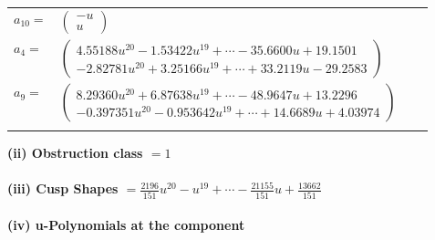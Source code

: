 \documentclass[1p]{elsarticle_modified}
\theoremstyle{definition}
\begin{document}
\begin{tabular}{m{7pt} m{180pt} m{7pt} m{180pt} }
\flushright $a_{10}=$&$\begin{pmatrix}- u\\u\end{pmatrix}$ \\
\flushright $a_{4}=$&$\begin{pmatrix}4.55188 u^{20}-1.53422 u^{19}+\cdots-35.6600 u+19.1501\\-2.82781 u^{20}+3.25166 u^{19}+\cdots+33.2119 u-29.2583\end{pmatrix}$ \\
\flushright $a_{9}=$&$\begin{pmatrix}8.29360 u^{20}+6.87638 u^{19}+\cdots-48.9647 u+13.2296\\-0.397351 u^{20}-0.953642 u^{19}+\cdots+14.6689 u+4.03974\end{pmatrix}$\\&\end{tabular}
\flushleft \textbf{(ii) Obstruction class $= 1$}\\~\\
\flushleft \textbf{(iii) Cusp Shapes $= \frac{2196}{151} u^{20}- u^{19}+\cdots-\frac{21155}{151} u+\frac{13662}{151}$}\\~\\
\newpage\renewcommand{\arraystretch}{1}
\flushleft \textbf{(iv) u-Polynomials at the component}\newline \\
\end{document}
